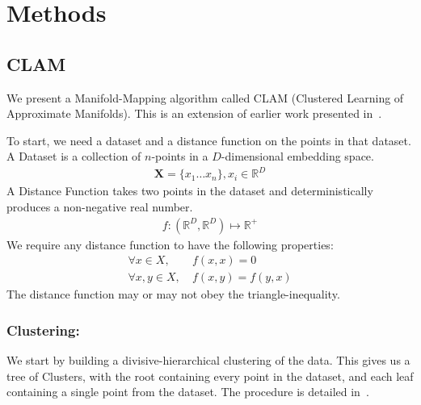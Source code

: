 \section{Methods}
\label{sec:methods}

\subsection{CLAM}
\label{subsec:methods:clam}

We present a Manifold-Mapping algorithm called CLAM (Clustered Learning of Approximate Manifolds).
This is an extension of earlier work presented in~\cite{ishaq2019entropy}.

To start, we need a dataset and a distance function on the points in that dataset.
A Dataset is a collection of $n$-points in a $D$-dimensional embedding space.
\begin{gather*}
    \textbf{X} = \{x_1 \dots x_n\}, x_i \in \mathbb{R}^D
\end{gather*}
A Distance Function takes two points in the dataset and deterministically produces a non-negative real number.
\begin{gather*}
    f : (\mathbb{R}^D, \mathbb{R}^D) \mapsto \mathbb{R}^+
\end{gather*}
We require any distance function to have the following properties:
\begin{align*}
    \forall x \in X, & \ f(x, x) = 0 \\
    \forall x, y \in X, & \ f(x, y) = f(y, x)
\end{align*}
The distance function may or may not obey the triangle-inequality.

\subsubsection*{Clustering:}
\label{subsubsec:methods:clam:clustering}
We start by building a divisive-hierarchical clustering of the data.
This gives us a tree of Clusters, with the root containing every point in the dataset, and each leaf containing a single point from the dataset.
The procedure is detailed in~\cite{ishaq2019entropy}.


